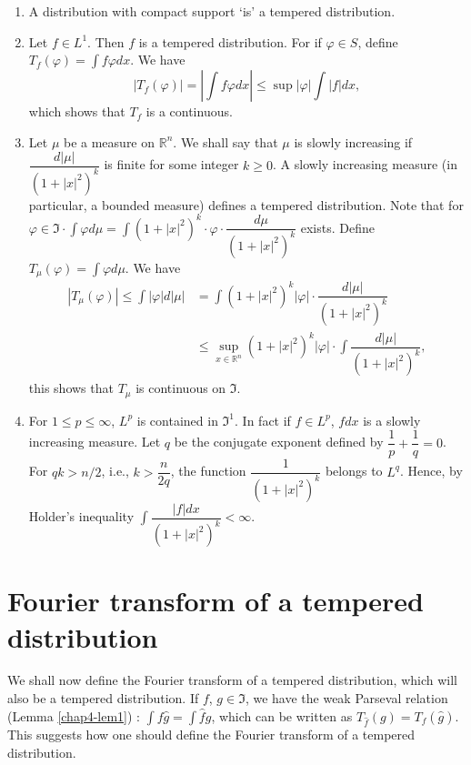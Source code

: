 \begin{examples*}
\begin{enumerate}
\renewcommand{\labelenumi}{(\theenumi)}
\item A distribution with compact support `is' a tempered
  distribution.

\item Let $f\in L^{1}$. Then $f$ is a tempered distribution. For if
  $\varphi\in S$, define $T_{f}(\varphi)=\int f\varphi dx$. We have
$$
|T_{f}(\varphi)|=\left| \int f\varphi dx\right|\leq \sup |\varphi|\int
|f| dx,
$$
which shows that $T_{f}$ is a continuous.

\item Let $\mu$ be a measure on $\mathbb{R}^{n}$. We shall say that
  $\mu$ is slowly increasing if $\dfrac{d|\mu|}{(1+|x|^{2})^{k}}$ is
  finite for some integer $k\geq 0$. A slowly increasing measure (in
  particular, a bounded measure) defines a tempered distribution. Note
  that for $\varphi \in \mathfrak{I}\cdot \int \varphi d\mu =\int
  (1+|x|^{2})^{k}\cdot \varphi\cdot \dfrac{d\mu}{(1+|x|^{2})^{k}}$
  exists. Define $T_{\mu}(\varphi)=\int \varphi d\mu$. We have
\begin{align*}
|T_{\mu}(\varphi)|\leq \int |\varphi|d|\mu| &= \int
(1+|x|^{2})^{k}|\varphi|\cdot \dfrac{d|\mu|}{(1+|x|^{2})^{k}}\\[4pt]
&\leq \sup\limits_{x\in \mathbb{R}^{n}}(1+|x|^{2})^{k}|\varphi|\cdot
\int \dfrac{d|\mu|}{(1+|x|^{2})^{k}},
\end{align*}
this shows that $T_{\mu}$ is continuous on $\mathfrak{I}$.

\item For $1\leq p\leq \infty$, $L^{p}$ is contained in
  $\mathfrak{I}^{1}$. In fact if $f\in L^{p}$, $fdx$ is\pageoriginale
  a slowly increasing measure. Let $q$ be the conjugate exponent
  defined by $\dfrac{1}{p}+\dfrac{1}{q}=0$. For $qk>n/2$, i.e.,
  $k>\dfrac{n}{2q}$, the function $\dfrac{1}{(1+|x|^{2})^{k}}$ belongs
  to $L^{q}$. Hence, by Holder's inequality $\int \dfrac{|f|dx}{(1+|x|^{2})^{k}}<\infty$.
\end{enumerate}
\end{examples*}

\section*{Fourier transform of a tempered distribution}

We shall now define the Fourier transform of a tempered distribution,
which will also be a tempered distribution. If $f$, $g\in
\mathfrak{I}$, we have the weak Parseval relation (Lemma
\ref{chap4-lem1}) : $\int f\widehat{g}=\int \widehat{f}g$, which can
be written as $T_{\widehat{f}}(g)=T_{f}(\widehat{g})$. This suggests
how one should define the Fourier transform of a tempered
distribution.

